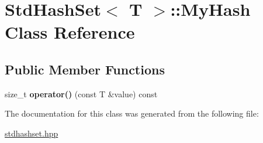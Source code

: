 \hypertarget{class_std_hash_set_1_1_my_hash}{\section{Std\-Hash\-Set$<$ T $>$\-:\-:My\-Hash Class Reference}
\label{class_std_hash_set_1_1_my_hash}
}
\subsection*{Public Member Functions}
\begin{DoxyCompactItemize}
\item 
\hypertarget{class_std_hash_set_1_1_my_hash_aac2096f95c7a7bd613cfb4a65d1d09e7}{size\-\_\-t {\bfseries operator()} (const T \&value) const }\label{class_std_hash_set_1_1_my_hash_aac2096f95c7a7bd613cfb4a65d1d09e7}

\end{DoxyCompactItemize}


The documentation for this class was generated from the following file\-:\begin{DoxyCompactItemize}
\item 
\hyperlink{stdhashset_8hpp}{stdhashset.\-hpp}\end{DoxyCompactItemize}
